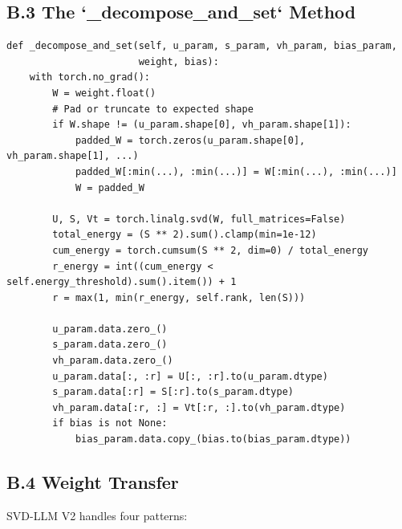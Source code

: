 \subsection{B.3 The `\_decompose\_and\_set` Method}

\begin{lstlisting}
def _decompose_and_set(self, u_param, s_param, vh_param, bias_param,
                       weight, bias):
    with torch.no_grad():
        W = weight.float()
        # Pad or truncate to expected shape
        if W.shape != (u_param.shape[0], vh_param.shape[1]):
            padded_W = torch.zeros(u_param.shape[0], vh_param.shape[1], ...)
            padded_W[:min(...), :min(...)] = W[:min(...), :min(...)]
            W = padded_W
        
        U, S, Vt = torch.linalg.svd(W, full_matrices=False)
        total_energy = (S ** 2).sum().clamp(min=1e-12)
        cum_energy = torch.cumsum(S ** 2, dim=0) / total_energy
        r_energy = int((cum_energy < self.energy_threshold).sum().item()) + 1
        r = max(1, min(r_energy, self.rank, len(S)))
        
        u_param.data.zero_()
        s_param.data.zero_()
        vh_param.data.zero_()
        u_param.data[:, :r] = U[:, :r].to(u_param.dtype)
        s_param.data[:r] = S[:r].to(s_param.dtype)
        vh_param.data[:r, :] = Vt[:r, :].to(vh_param.dtype)
        if bias is not None:
            bias_param.data.copy_(bias.to(bias_param.dtype))
\end{lstlisting}

\subsection{B.4 Weight Transfer}

SVD-LLM V2 handles four patterns:

